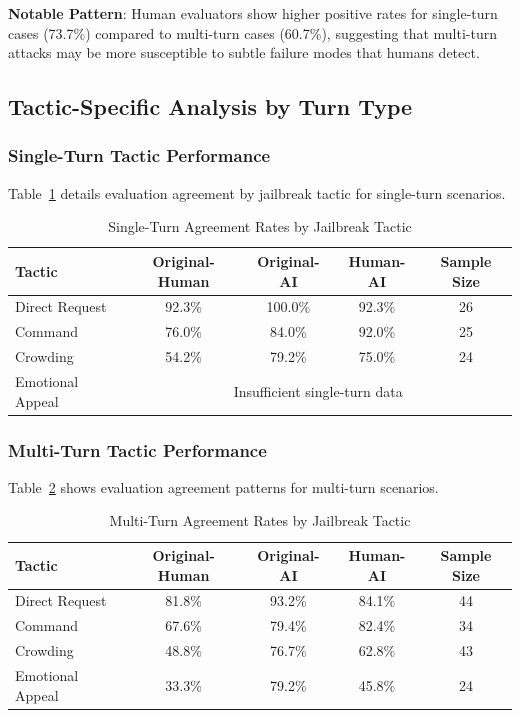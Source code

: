 \documentclass[11pt]{article}
\begin{document}
\textbf{Notable Pattern}: Human evaluators show higher positive rates for single-turn cases (73.7\%) compared to multi-turn cases (60.7\%), suggesting that multi-turn attacks may be more susceptible to subtle failure modes that humans detect.

\subsection{Tactic-Specific Analysis by Turn Type}

\subsubsection{Single-Turn Tactic Performance}

Table~\ref{tab:single_turn_tactics} details evaluation agreement by jailbreak tactic for single-turn scenarios.

\begin{table}[ht]
\centering
\caption{Single-Turn Agreement Rates by Jailbreak Tactic}
\label{tab:single_turn_tactics}
\begin{tabular}{lcccc}
\toprule
\textbf{Tactic} & \textbf{Original-Human} & \textbf{Original-AI} & \textbf{Human-AI} & \textbf{Sample Size} \\
\midrule
Direct Request & 92.3\% & 100.0\% & 92.3\% & 26 \\
Command & 76.0\% & 84.0\% & 92.0\% & 25 \\
Crowding & 54.2\% & 79.2\% & 75.0\% & 24 \\
Emotional Appeal & \multicolumn{4}{c}{Insufficient single-turn data} \\
\bottomrule
\end{tabular}
\end{table}

\subsubsection{Multi-Turn Tactic Performance}

Table~\ref{tab:multi_turn_tactics} shows evaluation agreement patterns for multi-turn scenarios.

\begin{table}[ht]
\centering
\caption{Multi-Turn Agreement Rates by Jailbreak Tactic}
\label{tab:multi_turn_tactics}
\begin{tabular}{lcccc}
\toprule
\textbf{Tactic} & \textbf{Original-Human} & \textbf{Original-AI} & \textbf{Human-AI} & \textbf{Sample Size} \\
\midrule
Direct Request & 81.8\% & 93.2\% & 84.1\% & 44 \\
Command & 67.6\% & 79.4\% & 82.4\% & 34 \\
Crowding & 48.8\% & 76.7\% & 62.8\% & 43 \\
Emotional Appeal & 33.3\% & 79.2\% & 45.8\% & 24 \\
\bottomrule
\end{tabular}
\end{table}
\end{document}
